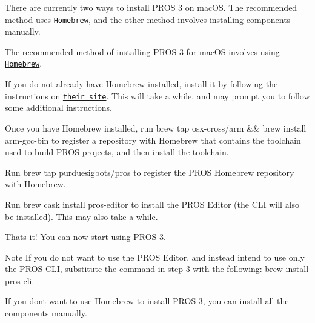 There are currently two ways to install P\+R\+OS 3 on mac\+OS. The recommended method uses \href{https://brew.sh/}{\tt Homebrew}, and the other method involves installing components manually.

The recommended method of installing P\+R\+OS 3 for mac\+OS involves using \href{https://brew.sh/}{\tt Homebrew}.


\begin{DoxyEnumerate}
\item If you do not already have Homebrew installed, install it by following the instructions on \href{https://brew.sh}{\tt their site}. This will take a while, and may prompt you to follow some additional instructions.
\item Once you have Homebrew installed, run brew tap osx-\/cross/arm \&\& brew install arm-\/gcc-\/bin to register a repository with Homebrew that contains the toolchain used to build P\+R\+OS projects, and then install the toolchain.
\item Run brew tap purduesigbots/pros to register the P\+R\+OS Homebrew repository with Homebrew.
\item Run brew cask install pros-\/editor to install the P\+R\+OS Editor (the C\+LI will also be installed). This may also take a while.
\item That\textquotesingle{}s it! You can now start using P\+R\+OS 3.
\end{DoxyEnumerate}

\begin{DoxyNote}{Note}
If you do not want to use the P\+R\+OS Editor, and instead intend to use only the P\+R\+OS C\+LI, substitute the command in step 3 with the following\+: brew install pros-\/cli.
\end{DoxyNote}


If you don\textquotesingle{}t want to use Homebrew to install P\+R\+OS 3, you can install all the components manually.


